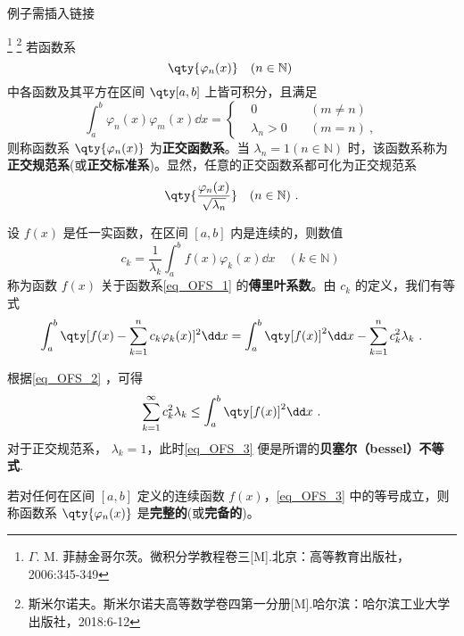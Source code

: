 \begin{issues}
例子需插入链接
\end{issues}

\footnote{$\Gamma$. M. 菲赫金哥尔茨。微积分学教程\;卷三[M].北京：高等教育出版社，2006:345-349}
\footnote{斯米尔诺夫。斯米尔诺夫高等数学卷四第一分册[M].哈尔滨：哈尔滨工业大学出版社，2018:6-12}
若函数系 
\begin{equation}\label{eq_OFS_1}
\qty{\varphi_n(x)}\quad(n\in \mathbb{N})~
\end{equation}
中各函数及其平方在区间 $\qty[a,b]$ 上皆可积分，且满足
\begin{equation}
\int_a^b\varphi_n(x)\varphi_m(x)\dd x=
\left\{
    \begin{aligned}
    &0\quad &(m\neq n)\\
   &\lambda_n>0\quad &(m=n)~,
    \end{aligned}
\right.
\end{equation}
则称函数系 $\qty{\varphi_n(x)}$ 为\textbf{正交函数系}。当 $\lambda_n=1(n\in\mathbb{N})$ 时，该函数系称为\textbf{正交规范系}(或\textbf{正交标准系})。显然，任意的正交函数系都可化为正交规范系 
\begin{equation}
\qty{\frac{\varphi_n(x)}{\sqrt{\lambda_n}}}\quad(n\in \mathbb{N})~.
\end{equation}

设 $f(x)$ 是任一实函数，在区间 $[a,b]$ 内是连续的，则数值
\begin{equation}
c_k=\frac{1}{\lambda_k}\int_a^b f(x)\varphi_k(x)\dd x\quad (k\in \mathbb{N})~
\end{equation}
称为函数 $f(x)$ 关于函数系\autoref{eq_OFS_1} 的\textbf{傅里叶系数}。由 $c_k$ 的定义，我们有等式
\begin{equation}\label{eq_OFS_2}
\int_a^b\qty[f(x)-\sum_{k=1}^nc_k\varphi_k(x)]^2\dd x=\int_a^b\qty[f(x)]^2\dd x-\sum_{k=1}^nc_k^2\lambda_k~.
\end{equation}

根据\autoref{eq_OFS_2} ，可得
\begin{equation}\label{eq_OFS_3}
\sum_{k=1}^\infty c_k^2\lambda_k\leq\int_a^b\qty[f(x)]^2\dd x~.
\end{equation}
对于正交规范系， $\lambda_k=1$，此时\autoref{eq_OFS_3} 便是所谓的\textbf{贝塞尔（bessel）不等式}. 

若对任何在区间 $[a,b]$ 定义的连续函数 $f(x)$，\autoref{eq_OFS_3} 中的等号成立，则称函数系 $\qty{\varphi_n(x)}$ 是\textbf{完整的}(或\textbf{完备的})。
